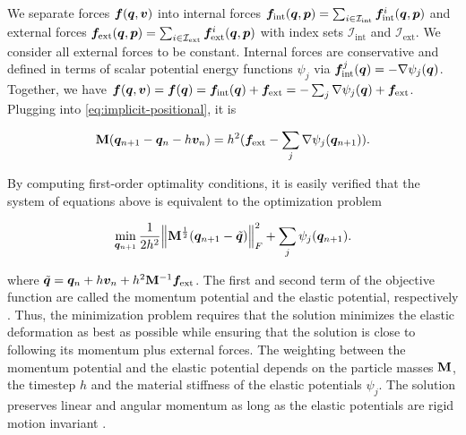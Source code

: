 \noindent We separate forces $\bm{f}(\bm{q}, \bm{v})$ into internal forces $\bm{f}_{\text{int}}(\bm{q}, \bm{p}) = \sum_{i \in \mathcal{I}_{\text{int}}} 
\bm{f}^i_{\text{int}}
(\bm{q}, \bm{p})$ and external forces $\bm{f}_{\text{ext}}(\bm{q}, \bm{p}) = \sum_{i \in \mathcal{I}_{\text{ext}}} \bm{f}^i_{\text{ext}}(\bm{q}, 
\bm{p})$ with index sets $\mathcal{I}_{\text{int}}$ and $\mathcal{I}_{\text{ext}}$. We consider all external forces to be constant. Internal forces 
are conservative and defined in terms of scalar potential energy functions 
$\psi_j$ via $\bm{f}^j_{\text{int}}(\bm{q}) = -\nabla \psi_j(\bm{q})$. Together, we have $\bm{f}(\bm{q}, \bm{v}) = \bm{f} (\bm{q}) 
= \bm{f}_{\text{int}} (\bm{q}) + \bm{f}_{\text{ext}} = -\sum_j \nabla \psi_j(\bm{q}) + \bm{f}_{\text{ext}}$. Plugging into 
\autoref{eq:implicit-positional}, it is

\begin{equation}\label{eq:implicit-positional-detailed}
    \mathbf{M}(\bm{q}_{n+1} - \bm{q}_n - h\bm{v}_n) = h^2(\bm{f_\text{ext}} - \sum_j \nabla \psi_j(\bm{q}_{n+1})).
\end{equation}

\noindent By computing first-order optimality conditions, it is easily verified that the system of equations above is equivalent to the optimization 
problem

\begin{equation}\label{eq:variational-implicit}
    \min_{\bm{q}_{n+1}} \frac{1}{2h^2} \norm{\mathbf{M}^{\frac{1}{2}}(\bm{q}_{n+1} - \tilde{\bm{q}})}^2_F + \sum_j \psi_j(\bm{q}_{n+1}).
\end{equation}

\noindent where $\tilde{\bm{q}} = \bm{q}_n + h\bm{v}_n + h^2\mathbf{M}^{-1}\bm{f}_{\text{ext}}$.  
The first and second term of the objective function are called the momentum potential and the elastic potential, respectively \cite{bouaziz2014}. 
Thus, the minimization problem requires that the solution minimizes the elastic deformation as best as possible while ensuring that the solution is 
close to following its momentum plus external forces. The weighting between the momentum potential and the elastic potential depends on the 
particle masses $\mathbf{M}$, the timestep $h$ and the material stiffness of the elastic potentials $\psi_j$. The solution preserves linear and 
angular momentum as long as the elastic potentials are rigid motion invariant \cite{bouaziz2014}.

